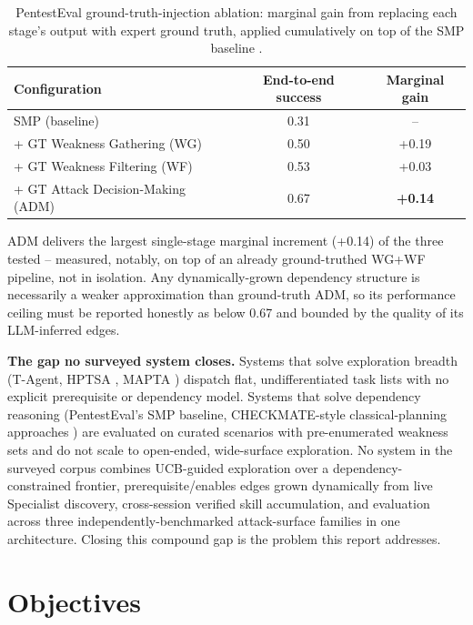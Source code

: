 \begin{table}[htbp]
\centering
\caption{PentestEval ground-truth-injection ablation: marginal gain from replacing each stage's output with expert ground truth, applied cumulatively on top of the SMP baseline \citep{yang2025pentesteval}.}
\label{tab:pentesteval-ablation}
\begin{tabular}{@{}lcc@{}}
\toprule
\textbf{Configuration} & \textbf{End-to-end success} & \textbf{Marginal gain} \\
\midrule
SMP (baseline)                          & 0.31 & --     \\
\quad + GT Weakness Gathering (WG)      & 0.50 & +0.19  \\
\quad + GT Weakness Filtering (WF)      & 0.53 & +0.03  \\
\quad + GT Attack Decision-Making (ADM) & 0.67 & \textbf{+0.14} \\
\bottomrule
\end{tabular}
\end{table}

ADM delivers the largest single-stage marginal increment (+0.14) of the three tested -- measured, notably, on top of an already ground-truthed WG+WF pipeline, not in isolation. Any dynamically-grown dependency structure is necessarily a weaker approximation than ground-truth ADM, so its performance ceiling must be reported honestly as below 0.67 and bounded by the quality of its LLM-inferred edges.

\textbf{The gap no surveyed system closes.} Systems that solve exploration breadth (T-Agent, HPTSA \citep{zhu2024hptsa}, MAPTA \citep{david2025mapta}) dispatch flat, undifferentiated task lists with no explicit prerequisite or dependency model. Systems that solve dependency reasoning (PentestEval's SMP baseline, CHECKMATE-style classical-planning approaches \citep{wang2025checkmate}) are evaluated on curated scenarios with pre-enumerated weakness sets and do not scale to open-ended, wide-surface exploration. No system in the surveyed corpus combines UCB-guided exploration over a dependency-constrained frontier, prerequisite/enables edges grown dynamically from live Specialist discovery, cross-session verified skill accumulation, and evaluation across three independently-benchmarked attack-surface families in one architecture. Closing this compound gap is the problem this report addresses.

\section{Objectives}
\label{sec:intro_objectives}

